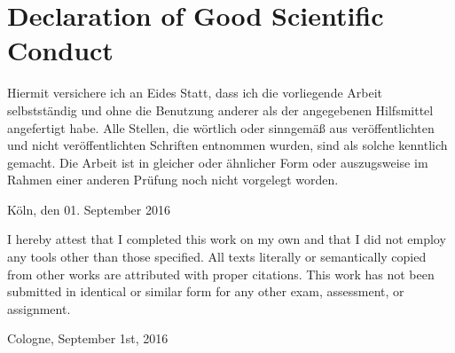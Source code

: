 \section*{Declaration of Good Scientific Conduct}

Hiermit versichere ich an Eides Statt, dass ich die vorliegende Arbeit selbstständig und ohne die Benutzung anderer als der angegebenen Hilfsmittel angefertigt habe. 
Alle Stellen, die wörtlich oder sinngemäß aus veröffentlichten und nicht veröffentlichten Schriften entnommen wurden, sind als solche kenntlich gemacht. 
Die Arbeit ist in gleicher oder ähnlicher Form oder auszugsweise im Rahmen einer anderen Prüfung noch nicht vorgelegt worden.

\vspace{15mm}
\begin{flushleft}
    Köln, den 01. September 2016
\end{flushleft}

\vspace{20mm}
I hereby attest that I completed this work on my own and that I did not employ any tools other than those specified. 
All texts literally or semantically copied from other works are attributed with proper citations. 
This work has not been submitted in identical or similar form for any other exam, assessment, or assignment.

\vspace{15mm}
\begin{flushleft}
    Cologne, September 1st, 2016
\end{flushleft}
	